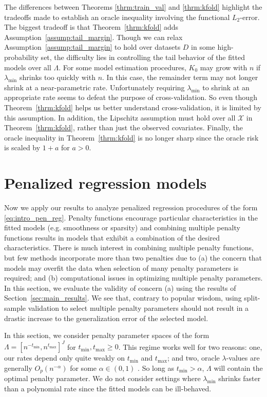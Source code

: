 \documentclass[12pt]{article} %
\theoremstyle{definition}
\begin{document}
The differences between Theorems \ref{thrm:train_val} and \ref{thrm:kfold} highlight the tradeoffs made to establish an oracle inequality involving the functional $L_2$-error.
The biggest tradeoff is that Theorem~\ref{thrm:kfold} adds Assumption~\ref{assump:tail_margin}.
Though we can relax Assumption~\ref{assump:tail_margin} to hold over datasets $D$ in some high-probability set, the difficulty lies in controlling the tail behavior of the fitted models over all $\Lambda$.
For some model estimation procedures, $K_0$ may grow with $n$ if $\lambda_{\min}$ shrinks too quickly with $n$.
In this case, the remainder term may not longer shrink at a near-parametric rate.
Unfortunately requiring $\lambda_{\min}$ to shrink at an appropriate rate seems to defeat the purpose of cross-validation.
So even though Theorem~\ref{thrm:kfold} helps us better understand cross-validation, it is limited by this assumption.
In addition, the Lipschitz assumption must hold over all $\mathcal{X}$ in Theorem~\ref{thrm:kfold}, rather than just the observed covariates.
Finally, the oracle inequality in Theorem~\ref{thrm:kfold} is no longer sharp since the oracle risk is scaled by $1+a$ for $a > 0$.

\section{Penalized regression models}
\label{sec:examples}
Now we apply our results to analyze penalized regression procedures of the form \eqref{eq:intro_pen_reg}.
Penalty functions encourage particular characteristics in the fitted models (e.g. smoothness or sparsity) and combining multiple penalty functions results in models that exhibit a combination of the desired characteristics. 
There is much interest in combining multiple penalty functions, but few methods incorporate more than two penalties due to (a) the concern that models may overfit the data when selection of many penalty parameters is required; and (b) computational issues in optimizing multiple penalty parameters. In this section, we evaluate the validity of concern (a) using the results of Section~\ref{sec:main_results}. We see that, contrary to popular wisdom, using split-sample validation to select multiple penalty parameters should not result in a drastic increase to the generalization error of the selected model.

In this section, we consider penalty parameter spaces of the form
$\Lambda = [ n^{-t_{\min}}, n^{t_{\max}}]^J$
for $t_{\min}, t_{\max} \ge 0$.
This regime works well for two reasons: one, our rates depend only quite weakly on $t_{\min}$ and $t_{\max}$; and two, oracle $\lambda$-values are generally $O_p(n^{-\alpha})$ for some $\alpha \in (0,1)$ \citep{van2000empirical, van2014additive, buhlmann2011statistics}. So long as $t_{\min} > \alpha$, $\Lambda$ will contain the optimal penalty parameter.
We do not consider settings where $\lambda_{\min}$ shrinks faster than a polynomial rate since the fitted models can be ill-behaved.
\end{document}
